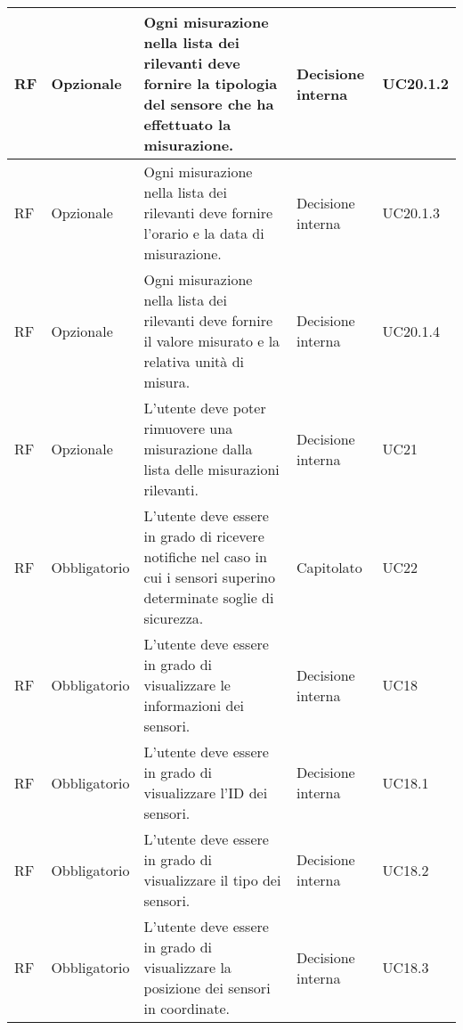 \begin{longtable}{|C{1.5cm}|C{2cm}|L{5cm}|C{2cm}|C{1.5cm}|}
    \hline
     RF & Opzionale & Ogni misurazione nella lista dei rilevanti deve fornire la tipologia del sensore che ha effettuato la misurazione. & Decisione interna & UC20.1.2 \\

    \hline
     RF & Opzionale & Ogni misurazione nella lista dei rilevanti deve fornire l'orario e la data di misurazione. & Decisione interna & UC20.1.3 \\

    \hline
     RF & Opzionale & Ogni misurazione nella lista dei rilevanti deve fornire il valore misurato e la relativa unità di misura. & Decisione interna & UC20.1.4 \\

    \hline
     RF & Opzionale & L'utente deve poter rimuovere una misurazione dalla lista delle misurazioni rilevanti. & Decisione interna & UC21 \\

    \hline
     RF & Obbligatorio & L'utente deve essere in grado di ricevere notifiche nel caso in cui i sensori superino determinate soglie di sicurezza. & Capitolato & UC22 \\

    \hline
     RF & Obbligatorio & L'utente deve essere in grado di visualizzare le informazioni dei sensori. & Decisione interna & UC18 \\

    \hline
     RF & Obbligatorio & L'utente deve essere in grado di visualizzare l'ID dei sensori. & Decisione interna  & UC18.1 \\

    \hline
     RF & Obbligatorio & L'utente deve essere in grado di visualizzare il tipo dei sensori. & Decisione interna & UC18.2 \\

    \hline
     RF & Obbligatorio & L'utente deve essere in grado di visualizzare la posizione dei sensori in coordinate. & Decisione interna & UC18.3 \\


\end{longtable}
